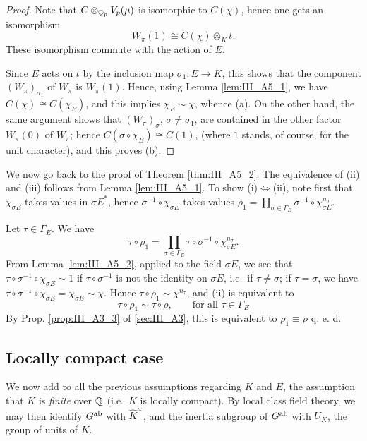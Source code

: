 \begin{subappendices}
\begin{proof}
Note that $C \otimes_{\mathbb{Q}_p} V_p(\mu)$ is isomorphic to $C(\chi)$, hence one gets
an isomorphism
\[
	W_\pi(1) \cong C(\chi) \otimes_K t. 
\]
These isomorphism commute with the action of $E$.

Since $E$ acts on $t$ by the inclusion map $\sigma_1 \colon  E \to K$, this
shows that the component $(W_\pi)_{\sigma_1}$ of $W_\pi$ is $W_\pi(1)$. Hence,
using Lemma \ref{lem:III_A5_1}, we have $C(\chi) \cong C(\chi_E)$, and this
implies $\chi_E \sim \chi$, whence (a). On the other hand, the same argument
shows that $(W_\pi)_\sigma$, $\sigma \neq \sigma_1$, are contained in the other
factor $W_\pi(0)$ of $W_\pi$; hence $C(\sigma \circ \chi_E) \cong C(1)$, (where
$1$ stands, of course, for the unit character), and this proves (b).
\end{proof}

We now go back to the proof of Theorem \ref{thm:III_A5_2}. The equivalence of
(ii) and (iii) follows from Lemma \ref{lem:III_A5_1}. To show (i)$\iff$(ii),
note first that $\chi_{\sigma E}$ takes values in $\sigma E^*$, hence
$\sigma^{-1} \circ \chi_{\sigma E}$ takes values $\rho_1 = \prod_{\sigma \in
\Gamma_E} \sigma^{-1} \circ \chi^{n_\sigma}_{\sigma E}$.
\dpage

Let $\tau \in \Gamma_E$. We have
\[
	\tau \circ \rho_1 = \prod_{\sigma \in \Gamma_E} \tau \circ \sigma^{-1}
\circ \chi_{\sigma E}^{n_\sigma}.
\]
From Lemma \ref{lem:III_A5_2}, applied to the field $\sigma E$, we see that
$\tau \circ \sigma^{-1} \circ \chi_{\sigma E} \sim 1$ if $\tau \circ
\sigma^{-1}$ is not the identity on $\sigma E$, i.e.\ if $\tau \neq \sigma$; if
$\tau = \sigma$, we have $\tau \circ \sigma^{-1} \circ \chi_{\sigma E} =
\chi_{\sigma E} \sim \chi$. Hence $\tau \circ \rho_1 \sim \chi^{n_\tau}$, and
(ii) is equivalent to 
\[
	\tau \circ \rho_1 \sim \tau \circ \rho, \qquad \text{for all $\tau \in
\Gamma_E$}
\]
By Prop. \ref{prop:III_A3_3} of \ref{sec:III_A3}, this is equivalent to $\rho_1 \equiv \rho$ q. e.
d.

\subsection{Locally compact case}
\label{sec:III_A6}
We now add to all the previous assumptions regarding $K$ and
$E$, the assumption that $K$ is \emph{finite} over $\mathbb{Q}$ (i.e.\ $K$ is locally
compact). By local class field theory, we may then identify $G^{\mathrm{ab}}$
with $\widehat{K}^\times$, and the inertia subgroup of $G^{\mathrm{ab}}$ with $U_K$, the group
of units of $K$.


\end{subappendices}
